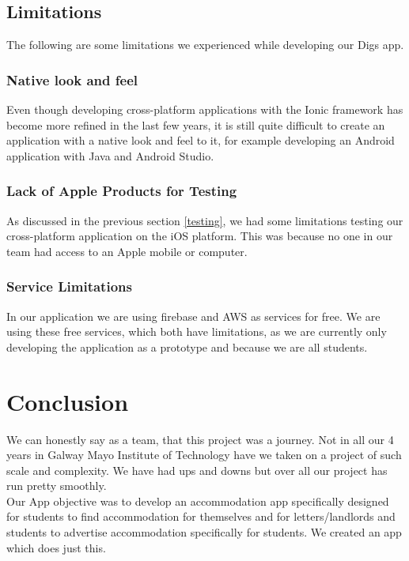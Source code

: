 \section{Limitations}
The following are some limitations we experienced while developing our Digs app.

\subsection{Native look and feel}
Even though developing cross-platform applications with the Ionic framework has become more refined in the last few years, it is still quite difficult to create an application with a native look and feel to it, for example developing an Android application with Java and Android Studio.

\subsection{Lack of Apple Products for Testing}
As discussed in the previous section \ref{testing}, we had some limitations testing our cross-platform application on the iOS platform. This was because no one in our team had access to an Apple mobile or computer.  

\subsection{Service Limitations}
In our application we are using firebase and AWS as services for free. We are using these free services, which both have limitations, as we are currently only developing the application as a prototype and because we are all students.

\chapter{Conclusion}

We can honestly say as a team, that this project was a journey. Not in all our 4 years in Galway Mayo Institute of Technology have we taken on a project of such scale and complexity. We have had ups and downs but over all our project has run pretty smoothly.\\

\noindent Our App objective was to develop an accommodation app specifically designed for students to find accommodation for themselves and for letters/landlords and students to advertise accommodation specifically for students. We created an app which does just this.\\

